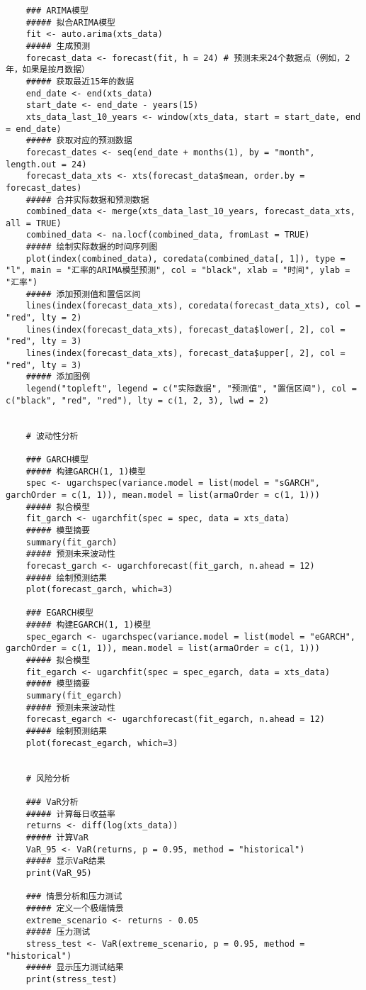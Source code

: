 \begin{lstlisting}
    ### ARIMA模型
    ##### 拟合ARIMA模型
    fit <- auto.arima(xts_data)
    ##### 生成预测
    forecast_data <- forecast(fit, h = 24) # 预测未来24个数据点（例如，2年，如果是按月数据）
    ##### 获取最近15年的数据
    end_date <- end(xts_data)
    start_date <- end_date - years(15)
    xts_data_last_10_years <- window(xts_data, start = start_date, end = end_date)
    ##### 获取对应的预测数据
    forecast_dates <- seq(end_date + months(1), by = "month", length.out = 24)
    forecast_data_xts <- xts(forecast_data$mean, order.by = forecast_dates)
    ##### 合并实际数据和预测数据
    combined_data <- merge(xts_data_last_10_years, forecast_data_xts, all = TRUE)
    combined_data <- na.locf(combined_data, fromLast = TRUE)
    ##### 绘制实际数据的时间序列图
    plot(index(combined_data), coredata(combined_data[, 1]), type = "l", main = "汇率的ARIMA模型预测", col = "black", xlab = "时间", ylab = "汇率")
    ##### 添加预测值和置信区间
    lines(index(forecast_data_xts), coredata(forecast_data_xts), col = "red", lty = 2)
    lines(index(forecast_data_xts), forecast_data$lower[, 2], col = "red", lty = 3)
    lines(index(forecast_data_xts), forecast_data$upper[, 2], col = "red", lty = 3)
    ##### 添加图例
    legend("topleft", legend = c("实际数据", "预测值", "置信区间"), col = c("black", "red", "red"), lty = c(1, 2, 3), lwd = 2)
    
    
    # 波动性分析
    
    ### GARCH模型
    ##### 构建GARCH(1, 1)模型
    spec <- ugarchspec(variance.model = list(model = "sGARCH", garchOrder = c(1, 1)), mean.model = list(armaOrder = c(1, 1)))
    ##### 拟合模型
    fit_garch <- ugarchfit(spec = spec, data = xts_data)
    ##### 模型摘要
    summary(fit_garch)
    ##### 预测未来波动性
    forecast_garch <- ugarchforecast(fit_garch, n.ahead = 12)
    ##### 绘制预测结果
    plot(forecast_garch, which=3)
    
    ### EGARCH模型
    ##### 构建EGARCH(1, 1)模型
    spec_egarch <- ugarchspec(variance.model = list(model = "eGARCH", garchOrder = c(1, 1)), mean.model = list(armaOrder = c(1, 1)))
    ##### 拟合模型
    fit_egarch <- ugarchfit(spec = spec_egarch, data = xts_data)
    ##### 模型摘要
    summary(fit_egarch)
    ##### 预测未来波动性
    forecast_egarch <- ugarchforecast(fit_egarch, n.ahead = 12)
    ##### 绘制预测结果
    plot(forecast_egarch, which=3)
    
    
    # 风险分析
    
    ### VaR分析
    ##### 计算每日收益率
    returns <- diff(log(xts_data))
    ##### 计算VaR
    VaR_95 <- VaR(returns, p = 0.95, method = "historical")
    ##### 显示VaR结果
    print(VaR_95)
    
    ### 情景分析和压力测试
    ##### 定义一个极端情景
    extreme_scenario <- returns - 0.05
    ##### 压力测试
    stress_test <- VaR(extreme_scenario, p = 0.95, method = "historical")
    ##### 显示压力测试结果
    print(stress_test)
\end{lstlisting}
